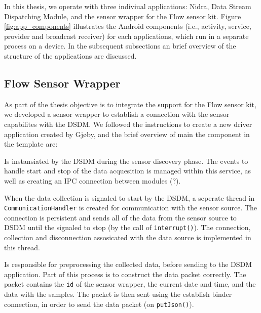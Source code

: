 In this thesis, we operate with three indiviual applications: Nidra, Data Stream Dispatching Module, and the sensor wrapper for the Flow sensor kit. Figure \ref{fig:app_components} illustrates the Android components (i.e., activity, service, provider and broadcast receiver) for each applications, which run in a separate process on a device. In the subsequent subsections an brief overview of the structure of the applications are discussed.


\subsection{Flow Sensor Wrapper}
As part of the thesis objective is to integrate the support for the Flow sensor kit, we developed a sensor wrapper to establish a connection with the sensor capabilites with the DSDM. We followed the instructions to create a new driver application created by Gjøby, and the brief overview of main the component in the template are:

\begin{description}[font=\normalfont\itshape]
    \item[WrapperService] Is instansiated by the DSDM during the sensor discovery phase. The events to handle start and stop of the data acquesition is managed within this service, as well as creating an IPC connection between modules (?). 
    \item[CommunicationHandler] When the data collection is signaled to start by the DSDM, a seperate thread in \verb|CommunicationHandler| is created for communication with the sensor source. The connection is persistent and sends all of the data from the sensor source to DSDM until the signaled to stop (by the call of \verb|interrupt()|). The connection, collection and disconnection assosicated with the data source is implemented in this thread.
    \item[DataHandler] Is responsible for preprocessing the collected data, before sending to the DSDM application. Part of this process is to construct the data packet correctly. The packet contains the \verb|id| of the sensor wrapper, the current date and time, and the data with the samples. The packet is then sent using the establish binder connection, in order to send the data packet (on \verb|putJson()|).
\end{description}

